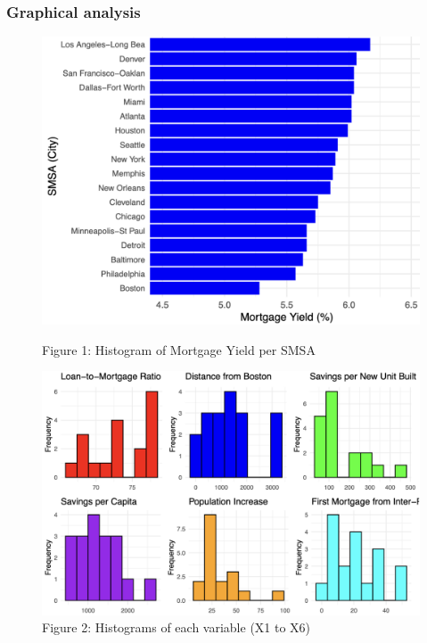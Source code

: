 \documentclass[
  12pt,
]{article}
\begin{document}
\subsubsection{Graphical analysis}\label{graphical-analysis}

\begin{figure}[H]
\centering

\begin{minipage}[t]{0.45\textwidth}
\centering
\includegraphics[width=1.1\linewidth]{figures/Figure 1.png}
\captionsetup{font=normalsize}
\caption*{Figure 1: Histogram of Mortgage Yield per SMSA}
\end{minipage}
\hfill
\begin{minipage}[t]{0.5\textwidth}
\centering
\vspace{-6cm}
\includegraphics[width=1.1\linewidth]{figures/Figure 2.png}
\captionsetup{font=normalsize}
\caption*{Figure 2: Histograms of each variable (X1 to X6)}
\end{minipage}

\end{figure}
\vspace{-0.5cm}
\end{document}
